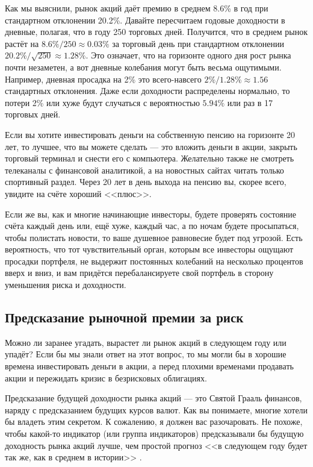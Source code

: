 Как мы выяснили, рынок акций даёт премию в среднем 8.6\% в год при стандартном отклонении 20.2\%. Давайте пересчитаем годовые доходности в дневные, полагая, что в году 250 торговых дней. Получится, что в среднем рынок растёт на
$8.6\% / 250 \approx 0.03\%$ за торговый день при стандартном отклонении $20.2\% / \sqrt{250} \approx 1.28\%$. Это означает, что на горизонте одного дня рост рынка почти незаметен, а вот дневные колебания могут быть весьма ощутимыми. Например, дневная просадка на 2\% это всего-навсего $2\%/1.28\% \approx 1.56$ стандартных отклонения. Даже если доходности распределены нормально, то потери 2\% или хуже будут случаться с вероятностью $5.94\%$ или раз в 17 торговых дней.

Если вы хотите инвестировать деньги на собственную пенсию на горизонте 20 лет, то лучшее, что вы можете сделать --- это вложить деньги в акции, закрыть торговый терминал и снести его с компьютера. Желательно также не смотреть телеканалы с финансовой аналитикой, а на новостных сайтах читать только спортивный раздел. Через 20 лет в день выхода на пенсию вы, скорее всего, увидите на счёте хороший <<плюс>>.

Если же вы, как и многие начинающие инвесторы, будете проверять состояние счёта каждый день или, ещё хуже, каждый час, а по ночам будете просыпаться, чтобы полистать новости, то ваше душевное равновесие будет под угрозой. Есть вероятность, что тот чувствительный орган, которым все инвесторы ощущают просадки портфеля, не выдержит постоянных колебаний на несколько процентов вверх и вниз, и вам придётся перебалансируете свой портфель в сторону уменьшения риска и доходности.

\subsection{Предсказание рыночной премии за риск}

Можно ли заранее угадать, вырастет ли рынок акций в следующем году или упадёт? Если бы мы знали ответ на этот вопрос, то мы могли бы в хорошие времена инвестировать деньги в акции, а перед плохими временами продавать акции и пережидать кризис в безрисковых облигациях.

Предсказание будущей доходности рынка акций --- это Святой Грааль финансов, наряду с предсказанием будущих курсов валют. Как вы понимаете, многие хотели бы владеть этим секретом. К сожалению, я должен вас разочаровать. Не похоже, чтобы какой-то индикатор (или группа индикаторов) предсказывали бы будущую доходность рынка акций лучше, чем простой прогноз <<в следующем году будет так же, как в среднем в истории>> \cite{welch2008comprehensive}.

